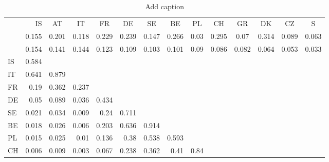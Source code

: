 \begin{table}[H]
  \centering
  \caption{Add caption}
    \begin{tabular}{lrrrrrrrrrrrrr}
          & \multicolumn{1}{p{4.785em}}{IS} & \multicolumn{1}{c}{AT} & \multicolumn{1}{c}{IT} & \multicolumn{1}{c}{FR} & \multicolumn{1}{c}{DE} & \multicolumn{1}{c}{SE} & \multicolumn{1}{c}{BE} & \multicolumn{1}{c}{PL} & \multicolumn{1}{c}{CH} & \multicolumn{1}{c}{GR} & \multicolumn{1}{c}{DK} & \multicolumn{1}{c}{CZ} & \multicolumn{1}{c}{S} \\
          & \multicolumn{1}{c}{0.155} & \multicolumn{1}{c}{0.201} & \multicolumn{1}{c}{0.118} & \multicolumn{1}{c}{0.229} & \multicolumn{1}{c}{0.239} & \multicolumn{1}{c}{0.147} & \multicolumn{1}{c}{0.266} & \multicolumn{1}{c}{0.03} & \multicolumn{1}{c}{0.295} & \multicolumn{1}{c}{0.07} & \multicolumn{1}{c}{0.314} & \multicolumn{1}{c}{0.089} & \multicolumn{1}{c}{0.063} \\
          & \multicolumn{1}{c}{0.154} & \multicolumn{1}{c}{0.141} & \multicolumn{1}{c}{0.144} & \multicolumn{1}{c}{0.123} & \multicolumn{1}{c}{0.109} & \multicolumn{1}{c}{0.103} & \multicolumn{1}{c}{0.101} & \multicolumn{1}{c}{0.09} & \multicolumn{1}{c}{0.086} & \multicolumn{1}{c}{0.082} & \multicolumn{1}{c}{0.064} & \multicolumn{1}{c}{0.053} & \multicolumn{1}{c}{0.033} \\
    IS    & 0.584 &       &       &       &       &       &       &       &       &       &       &       &  \\
    IT    & 0.641 & 0.879 &       &       &       &       &       &       &       &       &       &       &  \\
    FR    & 0.19  & 0.362 & 0.237 &       &       &       &       &       &       &       &       &       &  \\
    DE    & 0.05  & 0.089 & 0.036 & 0.434 &       &       &       &       &       &       &       &       &  \\
    SE    & 0.021 & 0.034 & 0.009 & 0.24  & 0.711 &       &       &       &       &       &       &       &  \\
    BE    & 0.018 & 0.026 & 0.006 & 0.203 & 0.636 & 0.914 &       &       &       &       &       &       &  \\
    PL    & 0.015 & 0.025 & 0.01  & 0.136 & 0.38  & 0.538 & 0.593 &       &       &       &       &       &  \\
    CH    & 0.006 & 0.009 & 0.003 & 0.067 & 0.238 & 0.362 & 0.41  & 0.84  &       &       &       &       &  \\

\end{tabular}
\end{table}
